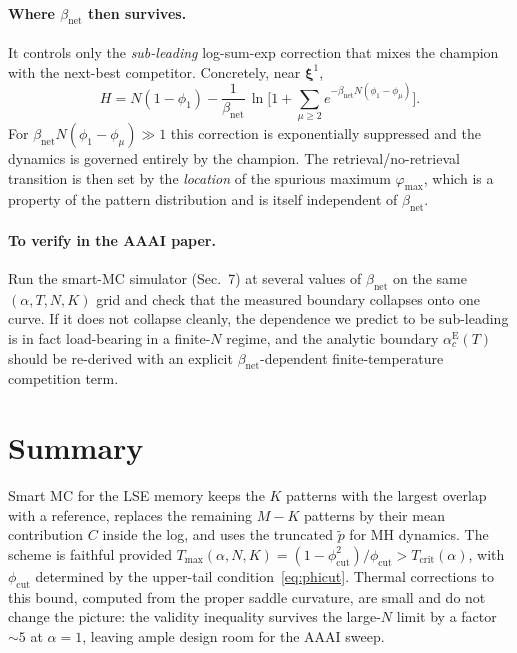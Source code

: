 \documentclass[11pt]{article}
\newcommand{\bxi}{\boldsymbol{\xi}}
\newcommand{\Pcut}{\phi_{\mathrm{cut}}}
\newcommand{\Tcrit}{T_{\mathrm{crit}}}
\newcommand{\Tmax}{T_{\mathrm{max}}}
\begin{document}
\paragraph{Where $\beta_{\mathrm{net}}$ then survives.} It controls only the \emph{sub-leading} log-sum-exp correction that mixes the champion with the next-best competitor. Concretely, near $\bxi^1$,
\begin{equation}
H = N(1-\phi_1) - \frac{1}{\beta_{\mathrm{net}}}\,\ln\!\Big[1 + \sum_{\mu\ge 2} e^{-\beta_{\mathrm{net}} N(\phi_1 - \phi_\mu)}\Big].
\end{equation}
For $\beta_{\mathrm{net}} N(\phi_1 - \phi_\mu) \gg 1$ this correction is exponentially suppressed and the dynamics is governed entirely by the champion. The retrieval/no-retrieval transition is then set by the \emph{location} of the spurious maximum $\varphi_{\max}$, which is a property of the pattern distribution and is itself independent of $\beta_{\mathrm{net}}$.

\paragraph{To verify in the AAAI paper.} Run the smart-MC simulator (Sec.~7) at several values of $\beta_{\mathrm{net}}$ on the same $(\alpha, T, N, K)$ grid and check that the measured boundary collapses onto one curve. If it does not collapse cleanly, the dependence we predict to be sub-leading is in fact load-bearing in a finite-$N$ regime, and the analytic boundary $\alpha_c^{\mathrm E}(T)$ should be re-derived with an explicit $\beta_{\mathrm{net}}$-dependent finite-temperature competition term.

\section{Summary}

Smart MC for the LSE memory keeps the $K$ patterns with the largest overlap with a reference, replaces the remaining $M-K$ patterns by their mean contribution $C$ inside the log, and uses the truncated $\tilde p$ for MH dynamics. The scheme is faithful provided $\Tmax(\alpha,N,K) = (1-\Pcut^2)/\Pcut > \Tcrit(\alpha)$, with $\Pcut$ determined by the upper-tail condition~\eqref{eq:phicut}. Thermal corrections to this bound, computed from the proper saddle curvature, are small and do not change the picture: the validity inequality survives the large-$N$ limit by a factor $\sim 5$ at $\alpha=1$, leaving ample design room for the AAAI sweep.
\end{document}
